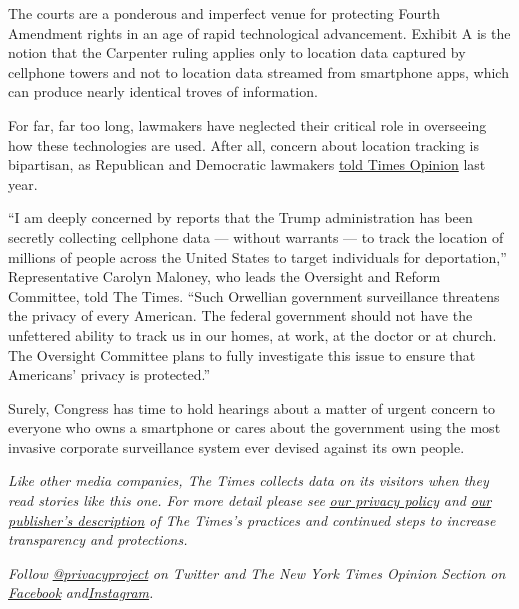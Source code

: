 The courts are a ponderous and imperfect venue for protecting Fourth
Amendment rights in an age of rapid technological advancement. Exhibit A
is the notion that the Carpenter ruling applies only to location data
captured by cellphone towers and not to location data streamed from
smartphone apps, which can produce nearly identical troves of
information.

For far, far too long, lawmakers have neglected their critical role in
overseeing how these technologies are used. After all, concern about
location tracking is bipartisan, as Republican and Democratic lawmakers
\href{https://www.nytimes.com/interactive/2019/12/19/opinion/location-tracking-cell-phone.html}{told
Times Opinion} last year.

``I am deeply concerned by reports that the Trump administration has
been secretly collecting cellphone data --- without warrants --- to
track the location of millions of people across the United States to
target individuals for deportation,'' Representative Carolyn Maloney,
who leads the Oversight and Reform Committee, told The Times. ``Such
Orwellian government surveillance threatens the privacy of every
American. The federal government should not have the unfettered ability
to track us in our homes, at work, at the doctor or at church. The
Oversight Committee plans to fully investigate this issue to ensure that
Americans' privacy is protected.''

Surely, Congress has time to hold hearings about a matter of urgent
concern to everyone who owns a smartphone or cares about the government
using the most invasive corporate surveillance system ever devised
against its own people.

\emph{Like other media companies, The Times collects data on its
visitors when they read stories like this one. For more detail please
see}
\href{https://help.nytimes.com/hc/en-us/articles/115014892108-Privacy-policy?module=inline}{\emph{our
privacy policy}} \emph{and}
\href{https://www.nytimes.com/2019/04/10/opinion/sulzberger-new-york-times-privacy.html?rref=collection\%2Fspotlightcollection\%2Fprivacy-project-does-privacy-matter\&action=click\&contentCollection=opinion\&region=stream\&module=stream_unit\&version=latest\&contentPlacement=8\&pgtype=collection}{\emph{our
publisher's description}} \emph{of The Times's practices and continued
steps to increase transparency and protections.}

\emph{Follow}
\href{https://twitter.com/privacyproject}{\emph{@privacyproject}}
\emph{on Twitter and The New York Times Opinion Section on}
\href{https://www.facebook.com/nytopinion}{\emph{Facebook}}
\emph{and}\href{https://www.instagram.com/nytopinion/}{\emph{Instagram}}\emph{.}

